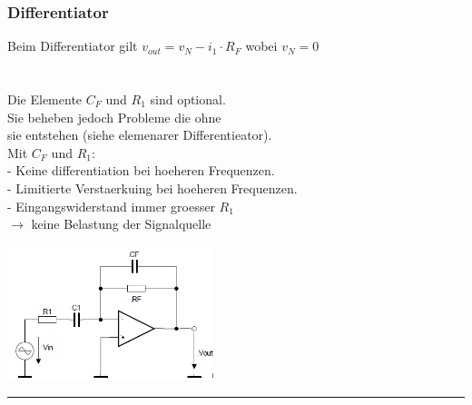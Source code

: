 		\subsubsection{Differentiator }
			\begin{minipage}[b]{12cm}
           		Beim Differentiator gilt $v_{out}=v_N-i_1 \cdot R_F$ wobei
           		$v_N=0$\\ \hspace*{10mm}\\
           		\hspace*{10mm}\\
           		Die Elemente $C_F$ und $R_1$ sind optional. \\
           		Sie beheben jedoch Probleme die ohne \\
           		sie entstehen (siehe elemenarer Differentieator). \\
           		Mit $C_F$ und $R_1$: \\
           		- Keine differentiation bei hoeheren Frequenzen. \\
           		- Limitierte Verstaerkuing bei hoeheren Frequenzen. \\
           		- Eingangswiderstand immer groesser $R_1$ \\ 
           		$\rightarrow$ keine Belastung der Signalquelle
           
           	\end{minipage}
			\begin{minipage}{6cm}
           		\includegraphics[width=6cm]{./bilder/differentiator.png}
           	\end{minipage}

\hrule


